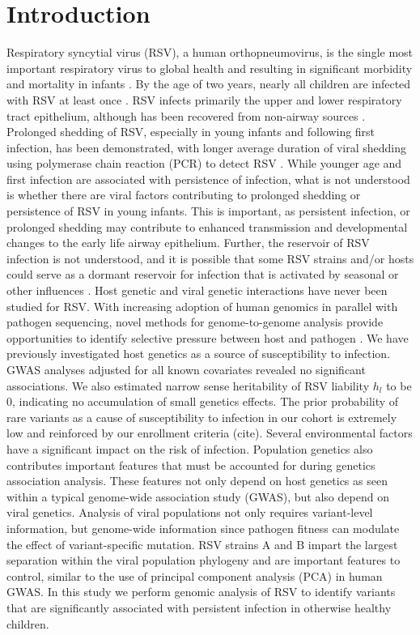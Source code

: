 \documentclass{article}
\begin{document}
\section{Introduction}
Respiratory syncytial virus (RSV), a human orthopneumovirus, is the single most important respiratory virus to global health and resulting in significant morbidity and mortality in infants 
\cite{hall_burden_2009}.
By the age of two years, nearly all children are infected with RSV at least once 
\cite{glezen_risk_1986}.
RSV infects primarily the upper and lower respiratory tract epithelium, although has been recovered from non-airway sources 
\cite{bokun_respiratory_2019,
cubie_detection_1997,
nadal_isolation_1990,
odonnell_respiratory_1998,
rezaee_respiratory_2011,
rohwedder_detection_1998}.
Prolonged shedding of RSV, especially in young infants and following first infection, has been demonstrated, with longer average duration of viral shedding using polymerase chain reaction (PCR) to detect RSV 
\cite{munywoki_influence_2015}.
While younger age and first infection are associated with persistence of infection, what is not understood is whether there are viral factors contributing to prolonged shedding or persistence of RSV in young infants. 
This is important, as persistent infection, or prolonged shedding may contribute to enhanced transmission and developmental changes to the early life airway epithelium. 
Further, the reservoir of RSV infection is not understood, 
and it is possible that some RSV strains and/or hosts could serve as a dormant reservoir for infection that is activated by seasonal or other influences 
\cite{hobson_persistent_2008}.
Host genetic and viral genetic interactions have never been studied for RSV.
With increasing adoption of human genomics in parallel with pathogen sequencing, novel methods for genome-to-genome analysis provide opportunities to identify selective pressure between host and pathogen \cite{naret2018correcting}.
We have previously investigated host genetics as a source of susceptibility to infection.
GWAS analyses adjusted for 
all known covariates revealed no significant associations.
We also estimated narrow sense heritability of RSV liability $h_l$ to be 0, indicating no accumulation of small genetics effects. 
The prior probability of rare variants as a cause of susceptibility
to infection in our cohort is extremely low and reinforced by our enrollment criteria (cite).
Several environmental factors have a significant impact on the risk of infection. 
Population genetics also contributes important features that must be accounted for during genetics association analysis. 
These features not only depend on host genetics as seen within a typical genome-wide association study (GWAS), but also depend on viral genetics.
Analysis of viral populations not only requires variant-level information, but genome-wide information since pathogen fitness can modulate the effect of variant-specific mutation.  
RSV strains A and B impart the largest separation within the viral population phylogeny and are important features to control, similar to the use of principal component analysis (PCA) in human GWAS.
In this study we perform genomic analysis of RSV to identify variants that are significantly associated with persistent infection in otherwise healthy children.
\end{document}
